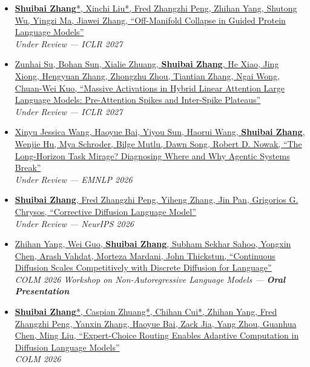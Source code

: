 \documentclass[a4paper,11pt]{article}
\begin{document}
\small{
\begin{itemize}[leftmargin=*,itemsep=4pt]

\item \href{https://arxiv.org/abs/2608.18597}{
\textbf{Shuibai Zhang}*, Xinchi Liu*, Fred Zhangzhi Peng, Zhihan Yang, Shutong Wu, Yingzi Ma, Jiawei Zhang,
``Off-Manifold Collapse in Guided Protein Language Models''} \\
\hfill \textit{Under Review --- ICLR 2027}

\item \href{https://arxiv.org/abs/2608.12149}{
Zunhai Su, Bohan Sun, Xialie Zhuang, \textbf{Shuibai Zhang}, He Xiao, Jing Xiong, Hengyuan Zhang, Zhongzhu Zhou, Tiantian Zhang, Ngai Wong, Chuan-Wei Kuo,
``Massive Activations in Hybrid Linear Attention Large Language Models: Pre-Attention Spikes and Inter-Spike Plateaus''} \\
\hfill \textit{Under Review --- ICLR 2027}

\item \href{https://arxiv.org/abs/2604.11978}{
Xinyu Jessica Wang, Haoyue Bai, Yiyou Sun, Haorui Wang, \textbf{Shuibai Zhang}, Wenjie Hu, Mya Schroder, Bilge Mutlu, Dawn Song, Robert D. Nowak,
``The Long-Horizon Task Mirage? Diagnosing Where and Why Agentic Systems Break''} \\
\hfill \textit{Under Review --- EMNLP 2026}

\item \href{https://arxiv.org/pdf/2512.15596}{
\textbf{Shuibai Zhang}, Fred Zhangzhi Peng, Yiheng Zhang, Jin Pan, Grigorios G. Chrysos,
``Corrective Diffusion Language Model''} \\
\hfill \textit{Under Review --- NeurIPS 2026}


\item \href{https://arxiv.org/pdf/2605.18530}{
Zhihan Yang, Wei Guo, \textbf{Shuibai Zhang}, Subham Sekhar Sahoo, Yongxin Chen, Arash Vahdat, Morteza Mardani, John Thickstun,
``Continuous Diffusion Scales Competitively with Discrete Diffusion for Language''} \\
\hfill \textit{COLM 2026 Workshop on Non-Autoregressive Language Models --- \textbf{Oral Presentation}}

\item \href{https://arxiv.org/abs/2604.01622}{
\textbf{Shuibai Zhang}*, Caspian Zhuang*, Chihan Cui*, Zhihan Yang, Fred Zhangzhi Peng, Yanxin Zhang, Haoyue Bai, Zack Jia, Yang Zhou, Guanhua Chen, Ming Liu,
``Expert-Choice Routing Enables Adaptive Computation in Diffusion Language Models''} \\
\hfill \textit{COLM 2026}


\end{itemize}}
\end{document}
